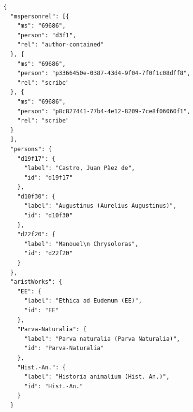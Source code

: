 \documentclass[ngerman,]{scrreprt}
\begin{document}
\begin{verbatim}
{
  "mspersonrel": [{
    "ms": "69686",
    "person": "d3f1",
    "rel": "author-contained"
  }, {
    "ms": "69686",
    "person": "p3366450e-0387-43d4-9f04-7f0f1c08dff8",
    "rel": "scribe"
  }, {
    "ms": "69686",
    "person": "p8c827441-77b4-4e12-8209-7ce8f06060f1",
    "rel": "scribe"
  }
  ],
  "persons": {
    "d19f17": {
      "label": "Castro, Juan Pàez de",
      "id": "d19f17"
    },
    "d10f30": {
      "label": "Augustinus (Aurelius Augustinus)",
      "id": "d10f30"
    },
    "d22f20": {
      "label": "Manouel\n Chrysoloras",
      "id": "d22f20"
    }
  },
  "aristWorks": {
    "EE": {
      "label": "Ethica ad Eudemum (EE)",
      "id": "EE"
    },
    "Parva-Naturalia": {
      "label": "Parva naturalia (Parva Naturalia)",
      "id": "Parva-Naturalia"
    },
    "Hist.-An.": {
      "label": "Historia animalium (Hist. An.)",
      "id": "Hist.-An."
    }
  }
\end{verbatim}
\end{document}
